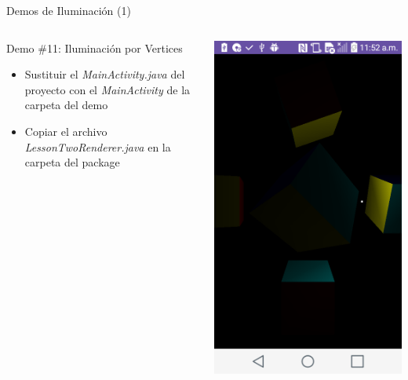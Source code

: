 \documentclass[aspectratio=169,compress]{beamer}
\begin{document}
\begin{frame}{Demos de Iluminación (1)}
\begin{columns}
\begin{column}{0.7\textwidth}
\begin{block}{Demo \#11: Iluminación por Vertices}
\begin{itemize}
\item Sustituir el \textit{MainActivity.java} del proyecto con el \textit{MainActivity} de la carpeta del demo
\item Copiar el archivo \textit{LessonTwoRenderer.java} en la carpeta del package
\end{itemize}
\end{block}
\end{column}
\begin{column}{0.3\textwidth}
\begin{center}
\includegraphics[width=1.0\linewidth]{PantallazosDemoTaller/Demo11.png}

\end{center}
\end{column}
\end{columns}
\end{frame}
\end{document}
